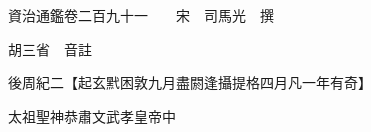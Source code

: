 










 


 
 


 

  
  
  
  
  





  
  
  
  
  
 
  

  

  
  
  



  

 
 

  
   




  

  
  


  　　資治通鑑卷二百九十一　　宋　司馬光　撰

　　胡三省　音註

　　後周紀二【起玄黓困敦九月盡閼逢攝提格四月凡一年有奇】

　　太祖聖神恭肅文武孝皇帝中

